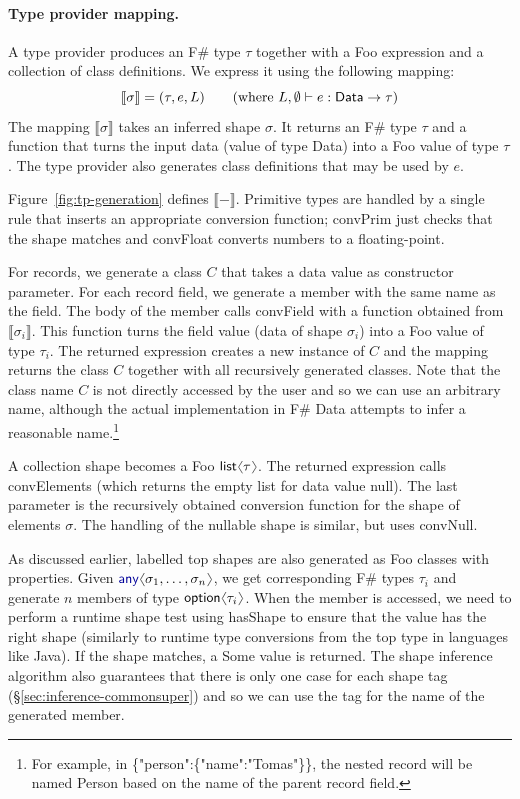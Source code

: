 \documentclass[10pt,preprint,clearpagebib]{sigplanconf}
\newcommand{\langl}{\begin{picture}(4.5,7)
\put(1.1,2.5){\rotatebox{60}{\line(1,0){5.5}}}
\put(1.1,2.5){\rotatebox{300}{\line(1,0){5.5}}}
\end{picture}}
\newcommand{\rangl}{\begin{picture}(4.5,7)
\put(.9,2.5){\rotatebox{120}{\line(1,0){5.5}}}
\put(.9,2.5){\rotatebox{240}{\line(1,0){5.5}}}
\end{picture}}
\newcommand{\kvd}[1]{\textnormal{\textcolor{kvdclr}{\sffamily #1}}}
\newcommand{\str}[1]{\textnormal{\textcolor{strclr}{\sffamily "#1"}}}
\newcommand{\ident}[1]{\textnormal{\sffamily #1}}
\newcommand{\sem}[1]{\llbracket #1 \rrbracket}
\begin{document}
\paragraph{Type provider mapping.}
A type provider produces an F\# type $\tau$ together with a Foo expression and a collection of 
class definitions. We express it using the following mapping:
%
\begin{equation*}
\sem{\sigma} = (\tau, e, L) \qquad (\textnormal{where}~L,\emptyset \vdash e:\ident{Data}\rightarrow\tau)
\end{equation*}
%
The mapping $\sem{\sigma}$ takes an inferred shape $\sigma$. It returns an F\# type $\tau$ and
a function that turns the input data (value of type \ident{Data}) into a Foo value of type $\tau$. 
The type provider also generates class definitions that may be used by $e$. 

Figure~\ref{fig:tp-generation} defines $\sem{-}$. Primitive types are handled by a single rule that
inserts an appropriate conversion function; \ident{convPrim} just checks that the shape matches
and \ident{convFloat} converts numbers to a floating-point.

For records, we generate a class $C$ that takes a data value as constructor parameter. For each 
record field, we generate a member with the same name as the field. The body of the member calls 
\ident{convField} with a function obtained from $\sem{\sigma_i}$. This function turns the field 
value (data of shape $\sigma_i$) into a Foo value of type $\tau_i$. The returned expression creates a new instance of 
$C$ and the mapping returns the class $C$ together with all recursively generated classes. Note that 
the class name $C$ is not directly accessed by the user and so we can use an arbitrary name, although the 
actual implementation in F\# Data attempts to infer a reasonable name.\footnote{For example, in 
\ident{\{\str{person}:\{\str{name}:\str{Tomas}\}\}}, the nested record will be named \ident{Person}
based on the name of the parent record field.}

A collection shape becomes a Foo $\ident{list}\langl\tau\rangl$. The returned expression calls \ident{convElements}
(which returns the empty list for data value \kvd{null}). The last parameter is the recursively obtained
conversion function for the shape of elements $\sigma$. The handling of the nullable shape is similar,
but uses \ident{convNull}.

As discussed earlier, labelled top shapes are also generated as Foo classes with properties. Given 
$\kvd{any}\langl\sigma_1, \ldots, \sigma_n\rangl$, we get corresponding F\# types $\tau_i$ and generate 
$n$ members of type $\ident{option}\langl \tau_i\rangl$. When the member is accessed, we need to perform
a runtime shape test using \ident{hasShape} to ensure that the value has the right shape (similarly to runtime 
type conversions from the top type in languages like Java). If the shape matches, a \ident{Some} value is 
returned. The shape inference algorithm also guarantees that there is only one case for each shape tag 
(\S\ref{sec:inference-commonsuper}) and so we can use the tag for the name of the generated member.
\end{document}
